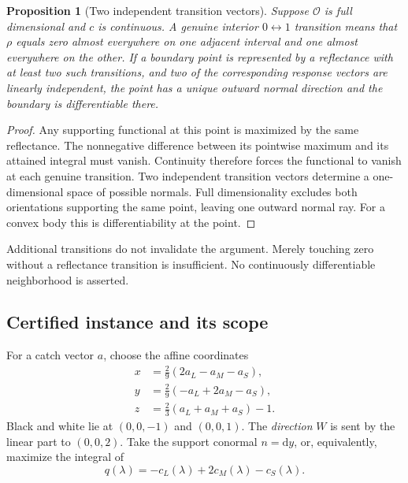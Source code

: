 \documentclass[9pt,twocolumn,twoside]{opticajnl}
\theoremstyle{plain}
\newtheorem{proposition}{Proposition}
\newcommand{\dd}{\mathrm{d}}
\begin{document}
\begin{proposition}[Two independent transition vectors]
\label{prop:transition-normal}
Suppose $\mathcal O$ is full dimensional and $c$ is continuous. A genuine interior $0\leftrightarrow1$ transition means that $\rho$ equals zero almost everywhere on one adjacent interval and one almost everywhere on the other. If a boundary point is represented by a reflectance with at least two such transitions, and two of the corresponding response vectors are linearly independent, the point has a unique outward normal direction and the boundary is differentiable there.
\end{proposition}
\begin{proof}
Any supporting functional at this point is maximized by the same reflectance. The nonnegative difference between its pointwise maximum and its attained integral must vanish. Continuity therefore forces the functional to vanish at each genuine transition. Two independent transition vectors determine a one-dimensional space of possible normals. Full dimensionality excludes both orientations supporting the same point, leaving one outward normal ray. For a convex body this is differentiability at the point.
\end{proof}
Additional transitions do not invalidate the argument. Merely touching zero without a reflectance transition is insufficient. No continuously differentiable neighborhood is asserted.

\subsection{Certified instance and its scope}
For a catch vector $a$, choose the affine coordinates
\begin{equation}
 \begin{aligned}
 x&=\tfrac29(2a_L-a_M-a_S),\\
 y&=\tfrac29(-a_L+2a_M-a_S),\\
 z&=\tfrac23(a_L+a_M+a_S)-1.
 \end{aligned}
 \label{eq:object-chart}
\end{equation}
Black and white lie at $(0,0,-1)$ and $(0,0,1)$. The \emph{direction} $W$ is sent by the linear part to $(0,0,2)$. Take the support conormal $n=\dd y$, or, equivalently, maximize the integral of
\begin{equation}
 q(\lambda)=-c_L(\lambda)+2c_M(\lambda)-c_S(\lambda).
 \label{eq:object-cost}
\end{equation}
\end{document}
